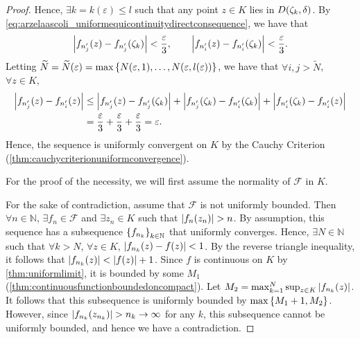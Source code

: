 \begin{proof}
    Hence, \(\exists k=k(\varepsilon)\leq l\) such that any point \(z\in K\) lies in \(D\qty(\zeta_k,\delta)\). By \cref{eq:arzelaascoli_uniformequicontinuitydirectconsequence}, we have that \[\abs{f_{n'_j}(z)-f_{n'_j}\qty(\zeta_k)}<\frac{\varepsilon}{3},\qquad \abs{f_{n'_i}(z)-f_{n'_i}\qty(\zeta_k)}<\frac{\varepsilon}{3}.\]
    Letting \(\widetilde{N}=\widetilde{N}(\varepsilon)=\max\cbraces{N(\varepsilon,1),\ldots,N(\varepsilon, l(\varepsilon))}\), we have that \(\forall i,j>\widetilde{N}\), \(\forall z\in K\),
    \begin{align*}
        \abs{f_{n'_j}(z)-f_{n'_i}(z)} & \leq\abs{f_{n'_j}(z)-f_{n'_j}\qty(\zeta_k)}+\abs{f_{n'_j}\qty(\zeta_k)-f_{n'_i}\qty(\zeta_{k})}+\abs{f_{n'_i}\qty(\zeta_{k})-f_{n'_i}(z)} \\
                                      & =\frac{\varepsilon}{3}+\frac{\varepsilon}{3}+\frac{\varepsilon}{3}=\varepsilon.
    \end{align*}
    Hence, the sequence is uniformly convergent on \(K\) by the Cauchy Criterion (\cref{thm:cauchycriterionuniformconvergence}).

    For the proof of the necessity, we will first assume the normality of \(\mathcal{F}\) in \(K\).

    For the sake of contradiction, assume that \(\mathcal{F}\) is not uniformly bounded. Then \(\forall n\in\mathbb{N}\), \(\exists f_n\in\mathcal{F}\) and \(\exists z_n\in K\) such that \(\abs{f_n\qty(z_n)}>n\). By assumption, this sequence has a subsequence \(\cbraces{f_{n_k}}_{k\in\mathbb{N}}\) that uniformly converges. Hence, \(\exists N\in\mathbb{N}\) such that \(\forall k>N\), \(\forall z\in K\), \(\abs{f_{n_k}(z)-f(z)}<1\). By the reverse triangle inequality, it follows that \(\abs{f_{n_k}(z)}<\abs{f(z)}+1\). Since \(f\) is continuous on \(K\) by \cref{thm:uniformlimit}, it is bounded by some \(M_1\) (\cref{thm:continuousfunctionboundedoncompact}). Let \(M_2=\max_{k=1}^N\sup_{z\in K}\abs{f_{n_k}(z)}\). It follows that this subsequence is uniformly bounded by \(\max\cbraces{M_1+1,M_2}\). However, since \(\abs{f_{n_k}\qty(z_{n_k})}>n_k\to\infty\) for any \(k\), this subsequence cannot be uniformly bounded, and hence we have a contradiction.


\end{proof}
